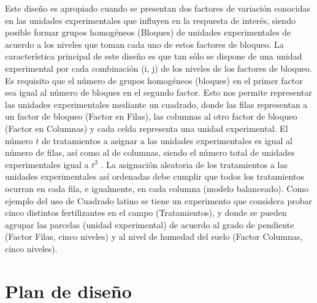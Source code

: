 \documentclass[]{book}
\newenvironment{Shaded}{\begin{snugshade}}{\end{snugshade}}
\newcommand{\KeywordTok}[1]{\textcolor[rgb]{0.13,0.29,0.53}{\textbf{#1}}}
\newcommand{\DataTypeTok}[1]{\textcolor[rgb]{0.13,0.29,0.53}{#1}}
\newcommand{\DecValTok}[1]{\textcolor[rgb]{0.00,0.00,0.81}{#1}}
\newcommand{\StringTok}[1]{\textcolor[rgb]{0.31,0.60,0.02}{#1}}
\newcommand{\CommentTok}[1]{\textcolor[rgb]{0.56,0.35,0.01}{\textit{#1}}}
\newcommand{\OperatorTok}[1]{\textcolor[rgb]{0.81,0.36,0.00}{\textbf{#1}}}
\newcommand{\NormalTok}[1]{#1}
\begin{document}
Este diseño es apropiado cuando se presentan dos factores de variación
conocidas en las unidades experimentales que influyen en la respuesta de
interés, siendo posible formar grupos homogéneos (Bloques) de unidades
experimentales de acuerdo a los niveles que toman cada uno de estos
factores de bloqueo. La característica principal de este diseño es que
tan sólo se dispone de una unidad experimental por cada combinación (i,
j) de los niveles de los factores de bloqueo. Es requisito que el número
de grupos homogéneos (bloques) en el primer factor sea igual al número
de bloques en el segundo factor. Esto nos permite representar las
unidades experimentales mediante un cuadrado, donde las filas
representan a un factor de bloqueo (Factor en Filas), las columnas al
otro factor de bloqueo (Factor en Columnas) y cada celda representa una
unidad experimental. El número \(t\) de tratamientos a asignar a las
unidades experimentales es igual al número de filas, así como al de
columnas, siendo el número total de unidades experimentales igual a
\(t^2\) . La asignación aleatoria de los tratamientos a las unidades
experimentales así ordenadas debe cumplir que todos los tratamientos
ocurran en cada fila, e igualmente, en cada columna (modelo balanceado).
Como ejemplo del uso de Cuadrado latino se tiene un experimento que
considera probar cinco distintos fertilizantes en el campo
(Tratamientos), y donde se pueden agrupar las parcelas (unidad
experimental) de acuerdo al grado de pendiente (Factor Filas, cinco
niveles) y al nivel de humedad del suelo (Factor Columnas, cinco
niveles).

\section{Plan de diseño}\label{plan-de-diseno-2}

\begin{Shaded}
\end{Shaded}
\end{document}
